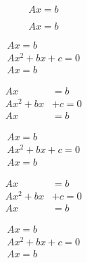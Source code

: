 \documentclass[a4paper, 12pt]{article}
\begin{document}
    \begin{equation} %
        Ax = b
    \end{equation}

    \begin{equation*} %
        Ax = b
    \end{equation*}


    \begin{align} %
        Ax = b
        \\ %
        Ax^2 + bx + c = 0 %
        \\ %
        Ax = b
    \end{align}

    \begin{align} %
        Ax &= b %
        \\ %
        Ax^2 + bx &+ c = 0 %
        \\ %
        Ax &= b %
    \end{align}

    \begin{align*} %
        Ax = b %
        \\ %
        Ax^2 + bx + c = 0 %
        \\ %
        Ax = b %
    \end{align*}

    \begin{align*} %
        Ax &= b %
        \\ %
        Ax^2 + bx &+ c = 0 %
        \\ %
        Ax &= b %
    \end{align*}


    \begin{gather} %
        Ax = b %
        \\ %
        Ax^2 + bx + c = 0 %
        \\ %
        Ax = b %
    \end{gather}
\end{document}
